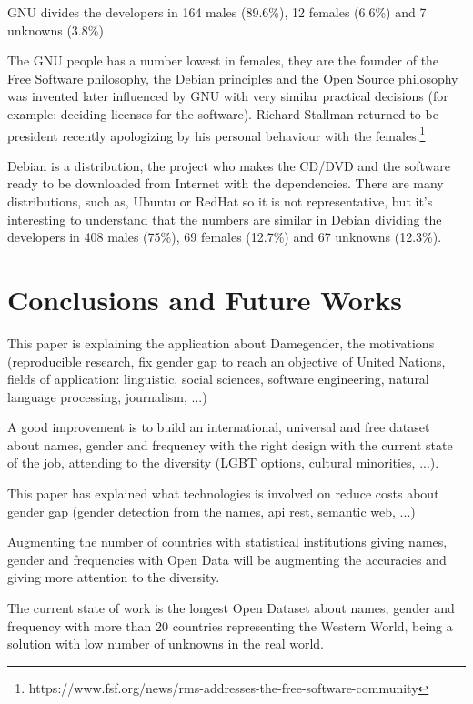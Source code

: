 \documentclass[a4paper]{article}
\begin{document}
GNU divides the developers in 164 males (89.6\%), 12 females (6.6\%)
and 7 unknowns (3.8\%)

The GNU people has a number lowest in females, they are the founder of
the Free Software philosophy, the Debian principles and the Open
Source philosophy was invented later influenced by GNU with very
similar practical decisions (for example: deciding licenses for the
software). Richard Stallman returned to be president recently
apologizing by his personal behaviour with the
females.\footnote{https://www.fsf.org/news/rms-addresses-the-free-software-community}

Debian is a distribution, the project who makes the CD/DVD and the
software ready to be downloaded from Internet with the
dependencies. There are many distributions, such as, Ubuntu or RedHat
so it is not representative, but it's interesting to understand that
the numbers are similar in Debian dividing the developers in 408 males
(75\%), 69 females (12.7\%) and 67 unknowns (12.3\%).


\section{Conclusions and Future Works}
\label{sec:conclusions}

This paper is explaining the application about Damegender, the
motivations (reproducible research, fix gender gap to reach an
objective of United Nations, fields of application: linguistic, social
sciences, software engineering, natural language processing,
journalism, ...)

A good improvement is to build an international, universal and free
dataset about names, gender and frequency with the right design with
the current state of the job, attending to the diversity (LGBT
options, cultural minorities, ...).

This paper has explained what technologies is involved on reduce costs
about gender gap (gender detection from the names, api rest, semantic
web, ...)

Augmenting the number of countries with statistical institutions
giving names, gender and frequencies with Open Data will be augmenting
the accuracies and giving more attention to the diversity.

The current state of work is the longest Open Dataset about names,
gender and frequency with more than 20 countries representing the
Western World, being a solution with low number of unknowns in the real
world.
\end{document}
